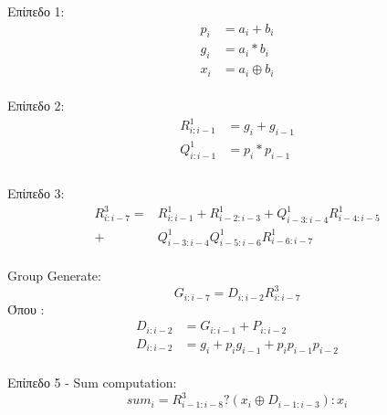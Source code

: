 %






Επίπεδο 1:\\
\begin{equation}
\begin{split}
p_i &= a_i + b_i\\
g_i &= a_i * b_i\\
x_i &= a_i \oplus b_i
\end{split}
\end{equation}
\\
Επίπεδο 2:\\
\begin{equation}
\begin{split}
R^1_{i:i-1} &= g_i + g_{i-1}\\
Q^1_{i:i-1} &= p_i * p_{i-1}\\
\end{split}
\end{equation}
\\
Επίπεδο 3:\\
\begin{equation}
\begin{split}
R^3_{i:i-7} =& R^1_{i:i-1} + R^1_{i-2:i-3} + Q^1_{i-3:i-4} R^1_{i-4:i-5} \\
            +& Q^1_{i-3:i-4} Q^1_{i-5:i-6} R^1_{i-6:i-7} 
\end{split}
\end{equation}
\\
Group Generate:\\
\begin{equation}
G_{i:i-7} = D_{i:i-2} R^3_{i:i-7}
\end{equation}
Όπου : 
\begin{equation}
\begin{split}
D_{i:i-2} &= G_{i:i-1} + P_{i:i-2}\\
D_{i:i-2} &= g_i + p_ig_{i-1} + p_ip_{i-1}p_{i-2}
\end{split}
\end{equation}
\\
Επίπεδο 5 - Sum computation:\\
\begin{equation}
sum_i = R^3_{i-1:i-8} ? (x_i \oplus D_{i-1:i-3}) : x_i
\end{equation}







